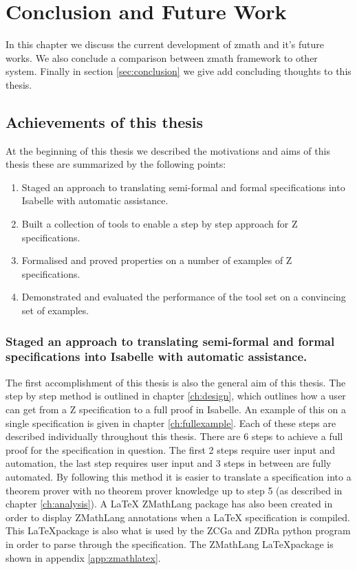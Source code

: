 \chapter{Conclusion and Future Work}
\label{ch:conclusion}

In this chapter we discuss the current development of \gls{zmath} and it's
future works. We also conclude a comparison between \gls{zmath} framework to
other system. Finally in section \ref{sec:conclusion} we give add concluding thoughts
to this thesis.


\section{Achievements of this thesis}

At the beginning of this thesis we described the motivations and aims of this
thesis these are summarized by the following points:

\begin{enumerate}

\item Staged an approach to translating semi-formal and formal specifications 
into Isabelle with automatic assistance.

\item Built a collection of tools to enable a step by step approach for Z
specifications.

\item Formalised and proved properties on a number of examples of Z
specifications.

\item Demonstrated and evaluated the performance of the tool set on a convincing
 set of examples.

\end{enumerate}

\subsection{Staged an approach to translating semi-formal and formal
specifications into Isabelle with automatic assistance.}

The first accomplishment of this thesis is also the general aim of this thesis.
The step by step method is outlined in chapter \ref{ch:design}, which outlines
how a user can get from a Z specification to a full proof in Isabelle. An
example of this on a single specification is given in chapter
\ref{ch:fullexample}. Each of these steps are described individually throughout
this thesis. There are 6 steps to achieve a full proof for the specification in
question. The first 2 steps require user input and automation, the last step
requires user input and 3 steps in between are fully automated. By following
this method it is easier to translate a specification into a theorem prover with
no theorem prover knowledge up to step 5 (as described in chapter
\ref{ch:analysis}). A \LaTeX{} ZMathLang package has also been created in order
to display ZMathLang annotations when a \LaTeX{} specification is compiled. This
\LaTeX package is also what is used by the ZCGa and ZDRa python program in order
to parse through the specification. The ZMathLang \LaTeX package is shown in
appendix \ref{app:zmathlatex}.

